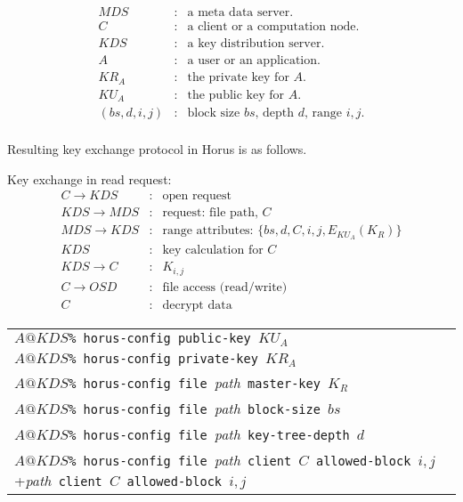\documentclass[11pt]{article}
\newcommand{\mds}{\ensuremath{\mathit{MDS}}}
\newcommand{\kds}{\ensuremath{\mathit{KDS}}}
\begin{document}
\begin{eqnarray*}
   \mds & : & \mbox{a meta data server.} \\
   C    & : & \mbox{a client or a computation node.} \\
   \kds & : & \mbox{a key distribution server.} \\
   A    & : & \mbox{a user or an application.} \\
   \textit{KR}_A & : & \mbox{the private key for $A$.} \\
   \textit{KU}_A & : & \mbox{the public key for $A$.} \\
   (bs,d,i,j) & : & \mbox{block size $bs$, depth $d$, range $i,j$.} \\
\end{eqnarray*}

Resulting key exchange protocol in Horus is as follows.

Key exchange in read request:
\begin{eqnarray}
  C \rightarrow \kds & : & \mbox{open request} \\
  \kds \rightarrow \mds & : & \mbox{request: file path, } C \\
  \mds \rightarrow \kds & : & \mbox{range attributes: }
    \{ bs,d,C,i,j,E_{KU_A}(K_R) \} \\
  \kds & : & \mbox{key calculation for } C \\
  \kds \rightarrow C & : & K_{i,j} \\
  C \rightarrow OSD & : & \mbox{file access (read/write)} \\
  C & : & \mbox{decrypt data}
\end{eqnarray}

\begin{tabular}{l}
  $A@\kds$\verb+% horus-config public-key +$KU_A$ \\
  $A@\kds$\verb+% horus-config private-key +$KR_A$ \\
  $A@\kds$\verb+% horus-config file +\textit{path}\verb+ master-key +$K_R$ \\
  $A@\kds$\verb+% horus-config file +\textit{path}\verb+ block-size +$bs$ \\
  $A@\kds$\verb+% horus-config file +\textit{path}\verb+ key-tree-depth +$d$ \\
  $A@\kds$\verb+% horus-config file +\textit{path}\verb+ client +$C$\verb+ allowed-block +$i,j$
\end{tabular}
\end{document}
